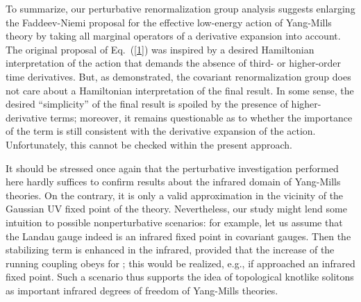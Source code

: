 \documentclass[a4paper,12pt]{article}
\providecommand{\re}[1]{~(\ref{#1})}\usepackage{useful_macros}
\begin{document}
To summarize, our perturbative renormalization group analysis suggests
enlarging the Faddeev-Niemi proposal for the effective low-energy
action of Yang-Mills theory by taking all marginal operators of a
derivative expansion into account. The original proposal of Eq.\re{1}
was inspired by a desired Hamiltonian interpretation of the action
that demands the absence of third- or higher-order time
derivatives. But, as demonstrated, the covariant renormalization group
does not care about a Hamiltonian interpretation of the final
result. In some sense, the desired ``simplicity'' of the final result
is spoiled by the presence of higher-derivative terms; moreover, it
remains questionable as to whether the importance of the
\myHighlight{$\partial^2\mn\cdot\partial^2\mn$}\coordHE{} term is still consistent with the
derivative expansion of the action. Unfortunately, this cannot be
checked within the present approach.

It should be stressed once again that the perturbative investigation
performed here hardly suffices to confirm results about the infrared
domain of Yang-Mills theories. On the contrary, it is only a valid
approximation in the vicinity of the Gaussian UV fixed point of the
theory. Nevertheless, our study might lend some intuition to 
possible nonperturbative scenarios: for example, let us assume that
the Landau gauge \coordHE{} indeed is an infrared fixed point in
covariant gauges. Then the stabilizing term \coordHE{} is enhanced in the infrared, provided that
the increase of the running coupling \coordHE{} obeys \coordHE{} for
\coordHE{}; this would be realized, e.g., if \coordHE{} approached an infrared
fixed point. Such a scenario thus supports the idea of topological
knotlike solitons as important infrared degrees of freedom of
Yang-Mills theories.
\end{document}
